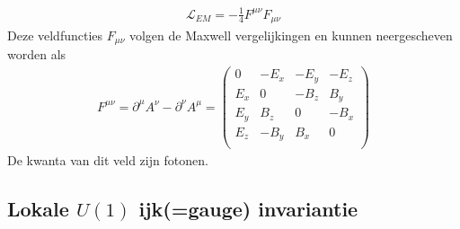 \documentclass[../main.tex]{subfiles}
\begin{document}
\begin{itemize}
        \begin{equation}
            \begin{aligned}
                \label{eq:lagr_vec}
                \mathcal{L}_{EM} = - \frac{1}{4} F^{\mu\nu}F_{\mu\nu}
            \end{aligned}
        \end{equation}
        Deze veldfuncties $F_{\mu\nu}$ volgen de Maxwell vergelijkingen en kunnen neergescheven worden als
        \begin{equation}
            \begin{aligned}
                \label{eq:veld_func_em}
                F^{\mu\nu} = \partial^\mu A^\nu - \partial^\nu A^\mu =
                \begin{pmatrix}
                    0 & -E_x & -E_y & -E_z \\
                    E_x & 0 & -B_z & B_y \\
                    E_y & B_z & 0 & -B_x \\
                    E_z & -B_y & B_x & 0 \\
                \end{pmatrix}
            \end{aligned}
        \end{equation}
        De kwanta van dit veld zijn fotonen.
\end{itemize}

\subsection{Lokale $U(1)$ ijk(=gauge) invariantie}%
\label{sub:lakale_u_1_gauge_invariantie}
\end{document}
